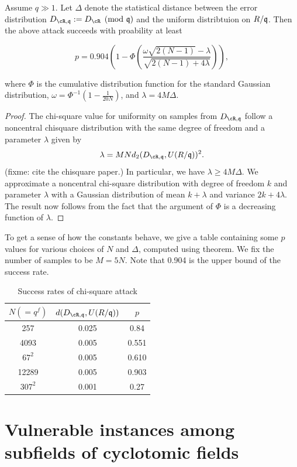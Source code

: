 \documentclass{amsart}
\begin{document}
\begin{theorem}
Assume $q \gg 1$. Let $\Delta$ denote the statistical distance between the error distribution $D_{\cR, \fq} := D_{\cR} \pmod{\fq}$ and the uniform distribtuion on $R/\mathfrak{q}$. Then the above attack succeeds with proability at least

$$p = 0.904 (1- \Phi(\frac{\omega \sqrt{2(N-1)}- \lambda}{\sqrt{2(N-1) +4\lambda}})),$$

where $\Phi$ is the cumulative distribution function for the standard Gaussian distribution, $\omega = \Phi^{-1}(1- \frac{1}{20N})$, and $\lambda = 4 M \Delta$.
\end{theorem}

\begin{proof}
The chi-square value for uniformity on samples from $D_{\cR, \fq}$ follow a noncentral chisquare distribution with the same degree of freedom and a parameter $\lambda$ given by
\[
    \lambda = MN d_2(D_{\cR, \fq}, U(R/\fq))^2.
\]
(fixme: cite the chisquare paper.)
In particular, we have $\lambda \geq  4M\Delta$.
We approximate a noncentral chi-square distribution with
degree of freedom $k$ and parameter $\lambda$ with a Gaussian
distribution of mean $k + \lambda$ and variance $2k + 4\lambda$. The result now follows from the fact that the argument of $\Phi$ is a decreasing function of $\lambda$.
\end{proof}

To get a sense of how the constants behave, we give a table containing some $p$ values for various choices of $N$ and $\Delta$, computed using theorem. We fix the number of samples to be $M = 5N$. Note that 0.904 is the upper bound of the success rate.

\begin{table}[H]
\caption{Success rates of chi-square attack}
\begin{tabular}{c|c|c}
$N (= q^f)$ & $d(D_{\cR, \fq},U(R/\fq))$ & $p$ \\ \hline
257 & 0.025 & 0.84 \\
4093 &   0.005     &  0.551 \\
$67^2$ & 0.005 & 0.610 \\
12289 & 0.005  & 0.903 \\
$307^2$ & 0.001 & 0.27
\end{tabular}
\end{table}

\section{Vulnerable instances among subfields of cyclotomic fields}
\end{document}
